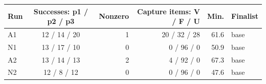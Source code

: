 \begin{tabularx}{\linewidth}{@{}lcrrrX@{}}
\toprule
Run & Successes: p1 / p2 / p3 & Nonzero & Capture items: V / F / U & Min. & Finalist \\
\midrule
A1 & 12 / 14 / 20 & 1 & 20 / 32 / 28 & 61.6 & base \\
N1 & 13 / 17 / 10 & 0 & 0 / 96 / 0 & 50.9 & base \\
A2 & 13 / 14 / 13 & 2 & 4 / 92 / 0 & 67.3 & base \\
N2 & 12 / 8 / 12 & 0 & 0 / 96 / 0 & 47.6 & base \\
\bottomrule
\end{tabularx}
